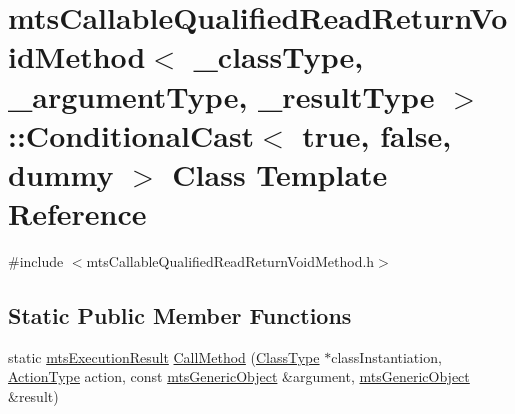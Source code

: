 \hypertarget{classmts_callable_qualified_read_return_void_method_1_1_conditional_cast_3_01true_00_01false_00_01dummy_01_4}{\section{mts\-Callable\-Qualified\-Read\-Return\-Void\-Method$<$ \-\_\-class\-Type, \-\_\-argument\-Type, \-\_\-result\-Type $>$\-:\-:Conditional\-Cast$<$ true, false, dummy $>$ Class Template Reference}
\label{classmts_callable_qualified_read_return_void_method_1_1_conditional_cast_3_01true_00_01false_00_01dummy_01_4}
}


{\ttfamily \#include $<$mts\-Callable\-Qualified\-Read\-Return\-Void\-Method.\-h$>$}

\subsection*{Static Public Member Functions}
\begin{DoxyCompactItemize}
\item 
static \hyperlink{classmts_execution_result}{mts\-Execution\-Result} \hyperlink{classmts_callable_qualified_read_return_void_method_1_1_conditional_cast_3_01true_00_01false_00_01dummy_01_4_a43d27bb53c8c31194037a095ef66ac3c}{Call\-Method} (\hyperlink{classmts_callable_qualified_read_return_void_method_ae99cfab8208eb374f2cdf01c97edfa3b}{Class\-Type} $\ast$class\-Instantiation, \hyperlink{classmts_callable_qualified_read_return_void_method_a7ac7450d5dce9ad80db720a370118211}{Action\-Type} action, const \hyperlink{classmts_generic_object}{mts\-Generic\-Object} \&argument, \hyperlink{classmts_generic_object}{mts\-Generic\-Object} \&result)
\end{DoxyCompactItemize}


